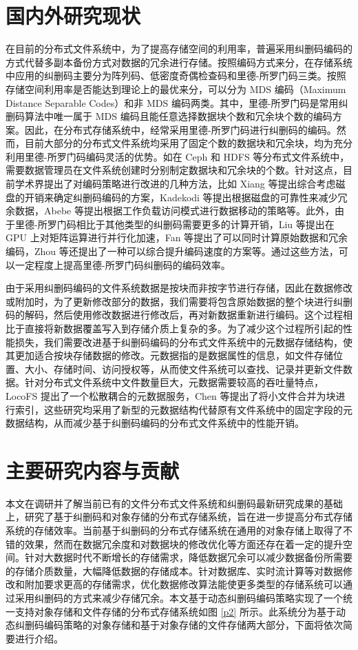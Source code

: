 \section{国内外研究现状}
在目前的分布式文件系统中，为了提高存储空间的利用率，普遍采用纠删码编码的方式代替多副本备份方式对数据的冗余进行存储。按照编码方式来分，在存储系统中应用的纠删码主要分为阵列码、低密度奇偶检查码和里德-所罗门码三类。按照存储空间利用率是否能达到理论上的最优来分，可以分为 MDS 编码（Maximum Distance Separable Codes）和非 MDS 编码两类。其中，里德-所罗门码是常用纠删码算法中唯一属于 MDS 编码且能任意选择数据块个数和冗余块个数的编码方案。因此，在分布式存储系统中，经常采用里德-所罗门码进行纠删码的编码。然而，目前大部分的分布式文件系统均采用了固定个数的数据块和冗余块，均为充分利用里德-所罗门码编码灵活的优势。如在 Ceph 和 HDFS 等分布式文件系统中，需要数据管理员在文件系统创建时分别制定数据块和冗余块的个数。针对这点，目前学术界提出了对编码策略进行改进的几种方法，比如 Xiang 等\cite{xiang2015joint}提出综合考虑磁盘的开销来确定纠删码编码的方案，Kadekodi 等\cite{kadekodi2019cluster}提出根据磁盘的可靠性来减少冗余数据，Abebe 等\cite{abebe2018ec}提出根据工作负载访问模式进行数据移动的策略等。此外，由于里德-所罗门码相比于其他类型的纠删码需要更多的计算开销，Liu 等\cite{liu2018g}提出在 GPU 上对矩阵运算进行并行化加速，Fan 等\cite{fan2019new}提出了可以同时计算原始数据和冗余编码，Zhou 等\cite{zhou2019fast}还提出了一种可以综合提升编码速度的方案等。通过这些方法，可以一定程度上提高里德-所罗门码纠删码的编码效率。

由于采用纠删码编码的文件系统数据是按块而非按字节进行存储，因此在数据修改或附加时，为了更新修改部分的数据，我们需要将包含原始数据的整个块进行纠删码的解码，然后使用修改数据进行修改后，再对新数据重新进行编码。这个过程相比于直接将新数据覆盖写入到存储介质上复杂的多。为了减少这个过程所引起的性能损失，我们需要改进基于纠删码编码的分布式文件系统中的元数据存储结构，使其更加适合按块存储数据的修改。元数据指的是数据属性的信息，如文件存储位置、大小、存储时间、访问授权等，从而使文件系统可以查找、记录并更新文件数据。针对分布式文件系统中文件数量巨大，元数据需要较高的吞吐量特点，LocoFS 提出了一个松散耦合的元数据服务\cite{li2017locofs}，Chen 等\cite{chen2017erasure}提出了将小文件合并为块进行索引，这些研究均采用了新型的元数据结构代替原有文件系统中的固定字段的元数据结构，从而减少基于纠删码编码的分布式文件系统中的性能开销。
\section{主要研究内容与贡献}
本文在调研并了解当前已有的文件分布式文件系统和纠删码最新研究成果的基础上，研究了基于纠删码和对象存储的分布式存储系统，旨在进一步提高分布式存储系统的存储效率。当前基于纠删码的分布式存储系统在通用的对象存储上取得了不错的效果，然而在数据冗余度和对数据块的修改优化等方面还存在着一定的提升空间。针对大数据时代不断增长的存储需求，降低数据冗余可以减少数据备份所需要的存储介质数量，大幅降低数据的存储成本。针对数据库、实时流计算等对数据修改和附加要求更高的存储需求，优化数据修改算法能使更多类型的存储系统可以通过采用纠删码的方式来减少存储冗余。本文基于动态纠删码编码策略实现了一个统一支持对象存储和文件存储的分布式存储系统如图 \ref{p2} 所示。此系统分为基于动态纠删码编码策略的对象存储和基于对象存储的文件存储两大部分，下面将依次简要进行介绍。

